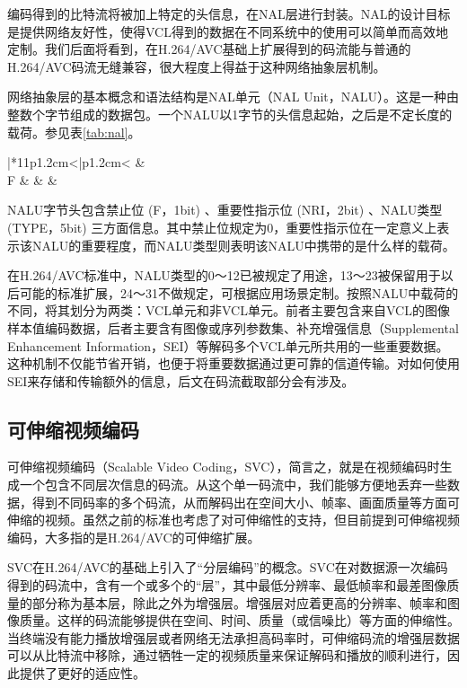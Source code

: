 编码得到的比特流将被加上特定的头信息，在NAL层进行封装。NAL的设计目标是提供网络友好性，使得VCL得到的数据在不同系统中的使用可以简单而高效地定制。我们后面将看到，在H.264/AVC基础上扩展得到的码流能与普通的H.264/AVC码流无缝兼容，很大程度上得益于这种网络抽象层机制。

网络抽象层的基本概念和语法结构是NAL单元（NAL Unit，NALU）。这是一种由整数个字节组成的数据包。一个NALU以1字节的头信息起始，之后是不定长度的载荷。参见表\ref{tab:nal}。

\begin{table}[h]
\centering
\caption{H.264/AVC中的NALU结构}
\label{tab:nal}
\begin{tabular}{|*{11}{p{1.2cm}<{\centering}|}{p{1.2cm}<{\centering}}}
	\hline
	 &  \\ \hline
	F &  &  &  \\ \hline
\end{tabular}
\end{table}

NALU字节头包含禁止位 (F，1bit) 、重要性指示位 (NRI，2bit) 、NALU类型 (TYPE，5bit) 三方面信息。其中禁止位规定为0，重要性指示位在一定意义上表示该NALU的重要程度，而NALU类型则表明该NALU中携带的是什么样的载荷。

在H.264/AVC标准中，NALU类型的0～12已被规定了用途，13～23被保留用于以后可能的标准扩展，24～31不做规定，可根据应用场景定制。按照NALU中载荷的不同，将其划分为两类：VCL单元和非VCL单元。前者主要包含来自VCL的图像样本值编码数据，后者主要含有图像或序列参数集、补充增强信息（Supplemental Enhancement Information，SEI）等解码多个VCL单元所共用的一些重要数据。这种机制不仅能节省开销，也便于将重要数据通过更可靠的信道传输。对如何使用SEI来存储和传输额外的信息，后文在码流截取部分会有涉及。

\subsection{可伸缩视频编码}

可伸缩视频编码（Scalable Video Coding，SVC），简言之，就是在视频编码时生成一个包含不同层次信息的码流。从这个单一码流中，我们能够方便地丢弃一些数据，得到不同码率的多个码流，从而解码出在空间大小、帧率、画面质量等方面可伸缩的视频。虽然之前的标准也考虑了对可伸缩性的支持，但目前提到可伸缩视频编码，大多指的是H.264/AVC的可伸缩扩展。

SVC在H.264/AVC的基础上引入了“分层编码”的概念。SVC在对数据源一次编码得到的码流中，含有一个或多个的“层”，其中最低分辨率、最低帧率和最差图像质量的部分称为基本层，除此之外为增强层。增强层对应着更高的分辨率、帧率和图像质量。这样的码流能够提供在空间、时间、质量（或信噪比）等方面的伸缩性。当终端没有能力播放增强层或者网络无法承担高码率时，可伸缩码流的增强层数据可以从比特流中移除，通过牺牲一定的视频质量来保证解码和播放的顺利进行，因此提供了更好的适应性。

